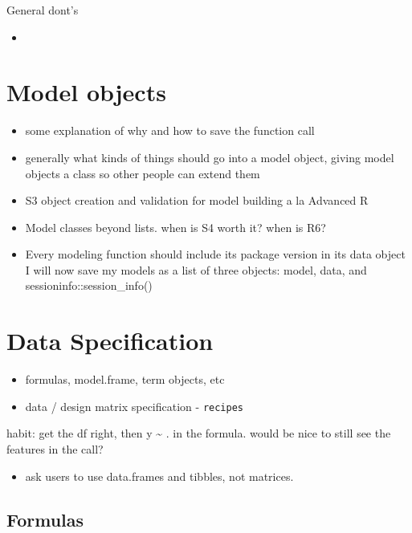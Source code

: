 \documentclass[]{book}
\providecommand{\tightlist}{%
  \setlength{\itemsep}{0pt}\setlength{\parskip}{0pt}}
\theoremstyle{definition}
\theoremstyle{definition}
\theoremstyle{definition}
\theoremstyle{remark}
\begin{document}
General dont's

\begin{itemize}
\item
\end{itemize}

\chapter{Model objects}\label{model-objects}

\begin{itemize}
\item
  some explanation of why and how to save the function call
\item
  generally what kinds of things should go into a model object, giving
  model objects a class so other people can extend them
\item
  S3 object creation and validation for model building a la Advanced R
\item
  Model classes beyond lists. when is S4 worth it? when is R6?
\item
  Every modeling function should include its package version in its data
  object I will now save my models as a list of three objects: model,
  data, and sessioninfo::session\_info()
\end{itemize}

\chapter{Data Specification}\label{data-specification}

\begin{itemize}
\item
  formulas, model.frame, term objects, etc
\item
  data / design matrix specification - \texttt{recipes}
\end{itemize}

habit: get the df right, then y \textasciitilde{} . in the formula.
would be nice to still see the features in the call?

\begin{itemize}
\tightlist
\item
  ask users to use data.frames and tibbles, not matrices.
\end{itemize}

\section{Formulas}\label{formulas}
\end{document}

